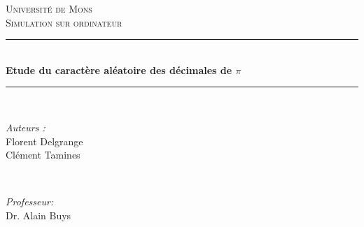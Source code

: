 \documentclass[10pt,a4paper]{article}
\begin{document}
\begin{titlepage}

\newcommand{\HRule}{\rule{\linewidth}{0.5mm}} %

\center %
 

\textsc{\LARGE Université de Mons}\\[1.5cm] %
\textsc{\Large Simulation sur ordinateur }\\[0.5cm] %


\HRule \\[0.4cm]
{ \huge \bfseries Etude du caractère aléatoire des décimales de $\pi$}\\[0.4cm] %
\HRule \\[1.5cm]
 

\begin{minipage}{0.4\textwidth}
\begin{flushleft} \large
\emph{Auteurs :}\\
Florent Delgrange \\
Clément Tamines
\end{flushleft}
\end{minipage}
~
\begin{minipage}{0.4\textwidth}
\begin{flushright} \large
\emph{Professeur:} \\
Dr. Alain Buys
\end{flushright}
\end{minipage}\\[4cm]



\end{titlepage}
\end{document}
